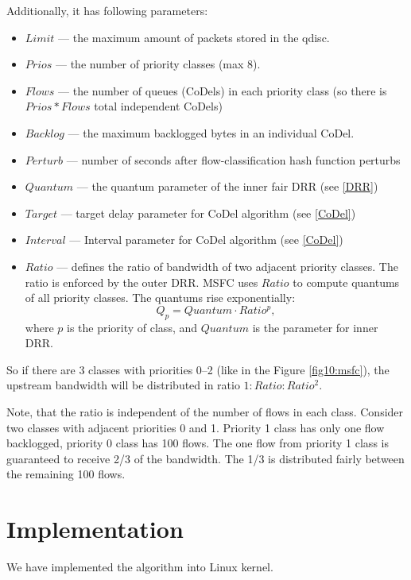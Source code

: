 Additionally, it has following parameters:
\begin{itemize}
	\item $Limit$ --- the maximum amount of packets stored in the qdisc.
	\item $Prios$ --- the number of priority classes (max 8).
	\item $Flows$ --- the number of queues (CoDels) in each priority class (so there is $Prios*Flows$ total independent CoDels)
	\item $Backlog$ --- the maximum backlogged bytes in an individual CoDel.
	\item $Perturb$ --- number of seconds after flow-classification hash function perturbs
	\item $Quantum$ --- the quantum parameter of the inner fair DRR (see \ref{DRR})
	\item $Target$ --- target delay parameter for CoDel algorithm (see \ref{CoDel})
	\item $Interval$ --- Interval parameter for CoDel algorithm (see \ref{CoDel})
	\item $Ratio$ --- defines the ratio of bandwidth of two adjacent priority classes. The ratio is enforced by the outer DRR. MSFC uses $Ratio$ to compute quantums of all priority classes. The quantums rise exponentially:
	\[
	Q_p = Quantum \cdot Ratio^p,
	\]
	where $p$ is the priority of class, and $Quantum$ is the parameter for inner DRR.
\end{itemize}
So if there are 3 classes with priorities 0--2 (like in the Figure \ref{fig10:msfc}), the upstream bandwidth will be distributed in ratio $1:Ratio:Ratio^2$.

Note, that the ratio is independent of the number of flows in each class. Consider two classes with adjacent priorities 0 and 1. Priority 1 class has only one flow backlogged, priority 0 class has 100 flows. The one flow from priority 1 class is guaranteed to receive 2/3 of the bandwidth. The 1/3 is distributed fairly between the remaining 100 flows.

\section {Implementation}

We have implemented the algorithm into Linux kernel. 

